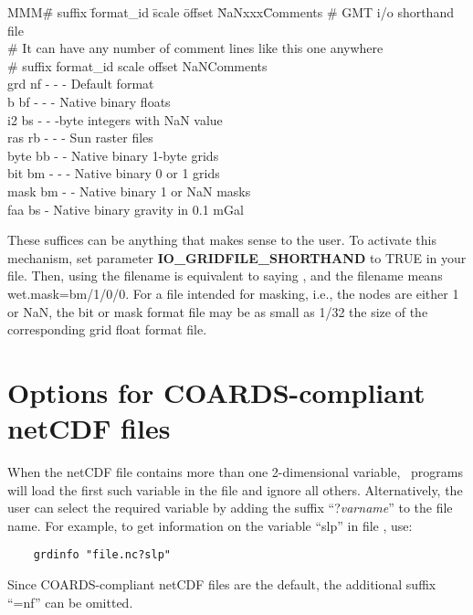 \noindent
\begin{tabbing}
MMM\=\# suffix \=format\_id \=scale \=offset \=NaNxxx\=Comments \kill 
\>\# GMT i/o shorthand file \\ 
\>\# It can have any number of comment lines like this one anywhere \\
\>\# suffix \> format\_id	\> scale \> offset \>NaN\>Comments \\ 
\>grd \> nf \> - \> - \> - \>Default format \\ 
\>b \> bf \> - \> - \> - \> Native binary floats \\ 
\>i2 \> bs \> - \> -  -byte integers with NaN value \\ 
\>ras \> rb \> - \> - \> - \> Sun raster files \\ 
\>byte \> bb \> - \> -  \> Native binary 1-byte grids \\ 
\>bit \> bm \> - \> - \> - \> Native binary 0 or 1 grids \\ 
\>mask \> bm \> - \> -  \> Native binary 1 or NaN masks \\ 
\>faa \> bs  \> -  \> Native binary gravity in 0.1 mGal
\end{tabbing} 

These suffices can be anything that makes sense to the user.  To
activate this mechanism, set parameter \textbf{IO\_GRIDFILE\_SHORTHAND} to TRUE in
your  file.  Then, using the filename
 is equivalent to saying ,
and the filename  means wet.mask=bm/1/0/0.  For a
file intended for masking, i.e., the nodes are either 1 or NaN,
the bit or mask format file may be as small as 1/32 the size of the
corresponding grid float format file. 

\section{Options for COARDS-compliant netCDF files}
\label{sec:netcdf}

When the netCDF file contains more than one 2-dimensional variable, \GMT\ programs
will load the first such variable in the file and ignore all others. Alternatively,
the user can select the
required variable by adding the suffix ``?\emph{varname}'' to the file name. For example,
to get information on the variable ``slp'' in file , use:
\begin{verbatim}
	grdinfo "file.nc?slp"
\end{verbatim}
Since COARDS-compliant netCDF files are the default, the additional suffix ``=nf'' can be omitted.

